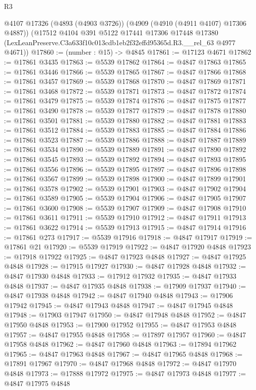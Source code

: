 \begin{lexlean}{R3}
\begin{coremodule}
    @4107
    @17326
    (@4893 (@4903 @3726))
    (@4909 (@4910 (@4911 @4107) @17306 @4887))
    (@17512
      @4104
      @391
      @5122
      @17441
      @17306
      @17448
      @17380
      (LexLeanPreserve.C3a633f10c013cdb1eb2f32effd95365d.R3.__rel_63 @4977 @4671))
@17860 := (number : @15) -> @4845
@17861 := @17123 @4671
@17862 := @17861 @3435
@17863 := @5539 @17862
@17864 := @4847 @17863
@17865 := @17861 @3446
@17866 := @5539 @17865
@17867 := @4847 @17866
@17868 := @17861 @3457
@17869 := @5539 @17868
@17870 := @4847 @17869
@17871 := @17861 @3468
@17872 := @5539 @17871
@17873 := @4847 @17872
@17874 := @17861 @3479
@17875 := @5539 @17874
@17876 := @4847 @17875
@17877 := @17861 @3490
@17878 := @5539 @17877
@17879 := @4847 @17878
@17880 := @17861 @3501
@17881 := @5539 @17880
@17882 := @4847 @17881
@17883 := @17861 @3512
@17884 := @5539 @17883
@17885 := @4847 @17884
@17886 := @17861 @3523
@17887 := @5539 @17886
@17888 := @4847 @17887
@17889 := @17861 @3534
@17890 := @5539 @17889
@17891 := @4847 @17890
@17892 := @17861 @3545
@17893 := @5539 @17892
@17894 := @4847 @17893
@17895 := @17861 @3556
@17896 := @5539 @17895
@17897 := @4847 @17896
@17898 := @17861 @3567
@17899 := @5539 @17898
@17900 := @4847 @17899
@17901 := @17861 @3578
@17902 := @5539 @17901
@17903 := @4847 @17902
@17904 := @17861 @3589
@17905 := @5539 @17904
@17906 := @4847 @17905
@17907 := @17861 @3600
@17908 := @5539 @17907
@17909 := @4847 @17908
@17910 := @17861 @3611
@17911 := @5539 @17910
@17912 := @4847 @17911
@17913 := @17861 @3622
@17914 := @5539 @17913
@17915 := @4847 @17914
@17916 := @17861 @273
@17917 := @5539 @17916
@17918 := @4847 @17917
@17919 := @17861 @21
@17920 := @5539 @17919
@17922 := @4847 @17920 @4848
@17923 := @17918 @17922
@17925 := @4847 @17923 @4848
@17927 := @4847 @17925 @4848
@17928 := @17915 @17927
@17930 := @4847 @17928 @4848
@17932 := @4847 @17930 @4848
@17933 := @17912 @17932
@17935 := @4847 @17933 @4848
@17937 := @4847 @17935 @4848
@17938 := @17909 @17937
@17940 := @4847 @17938 @4848
@17942 := @4847 @17940 @4848
@17943 := @17906 @17942
@17945 := @4847 @17943 @4848
@17947 := @4847 @17945 @4848
@17948 := @17903 @17947
@17950 := @4847 @17948 @4848
@17952 := @4847 @17950 @4848
@17953 := @17900 @17952
@17955 := @4847 @17953 @4848
@17957 := @4847 @17955 @4848
@17958 := @17897 @17957
@17960 := @4847 @17958 @4848
@17962 := @4847 @17960 @4848
@17963 := @17894 @17962
@17965 := @4847 @17963 @4848
@17967 := @4847 @17965 @4848
@17968 := @17891 @17967
@17970 := @4847 @17968 @4848
@17972 := @4847 @17970 @4848
@17973 := @17888 @17972
@17975 := @4847 @17973 @4848
@17977 := @4847 @17975 @4848

\end{coremodule}
\end{lexlean}
